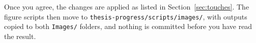 \documentclass[11pt,a4paper]{article}
\begin{document}
\noindent Once you agree, the changes are applied as listed in
Section~\ref{sec:touches}. The figure scripts then move to
\texttt{thesis-progress/scripts/images/}, with outputs copied to both
\texttt{Images/} folders, and nothing is committed before you have read
the result.



\end{document}
